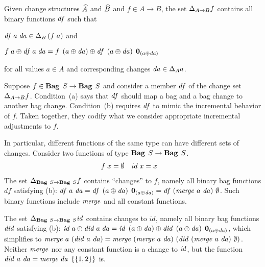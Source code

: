 
\begin{definition}
  \label{def:function-changes:change}
  Given change structures $\widehat{A}$ and $\widehat{B}$ and
  $f \in A \to B$,
  the set $\Change[A \to B]{f}$ contains all binary functions $\mathit{df}$ such that
  \begin{subdefinition}
    \item
      \label{def:function-changes:signature}
      $\App{\App{\D f}{a}}{\D a} \in \Change[B]{\App*{f}{a}}$ and
    \item
      \label{def:function-changes:validity}
      $\App{f}{a} \UPDATE \App{\App{\D f}{a}}{\D a} =
      {\App{f}{\TheNewValue}}
      \UPDATE
      \App{\App{\D f}{\TheNewValue}}{\Nil{\TheNewValue}}$
  \end{subdefinition}
  for all values $a \in A$ and corresponding changes $\D a \in
  \Change[A]{a}$.
\end{definition}

\begin{examples}
Suppose $f\in\Fun{\Bag S}{\Bag S}$ and consider a member $\mathit{df}$ of
the change set $\Change[A \to B]{f}$. Condition~(a) says that $\mathit{df}$ should map a bag and a bag change to another bag change.
Condition~(b) requires $\mathit{df}$ to mimic the incremental behavior
of $f$. Taken together, they codify what we consider appropriate
incremental adjustments to $f$.

In particular, different functions of the same type can have
different sets of changes. Consider two functions of type
$\Fun{\Bag S}{\Bag S}$.
\begin{align*}
\App{f}{x} & = \Empty & \App{\Var{id}}{x} & = x
\end{align*}
The set
$\Change[\Fun{\Bag S}{\Bag S}] f$ contains ``changes'' to $f$,
namely all binary bag functions $df$ satisfying
(b): $\D{f}~a~\D{a}=\D{f}\APP\Upd*{a}\APP\Nil{\Upd*{a}}= \D{f}~(\MERGE~a~\D{a})~\Empty$.
Such binary functions include
$\mathit{merge}$ and all constant functions.

The set $\Change[\Fun{\Bag S}{\Bag S}]\Term{id}$ contains changes to $id$,
namely all binary bag functions $\mathit{did}$ satisfying
(b):
$\Term{id}\APP a \UPDATE \D{id} \APP a \APP \D{a} =
\Term{id} \APP \Upd*{a} \UPDATE \D{id} \APP \Upd*{a} \APP
\Nil{\Upd*{a}}$, which simplifies to
$\MERGE~a~(\D{id}~a~\D{a})=
\MERGE~(\MERGE~a~\D{a})~(\D{id}~(\MERGE~a~\D{a})~\Empty)$.
Neither $\mathit{merge}$ nor any constant function is a change to
$\mathit{id}$,
but the function
$
\D{id}~a~\D a = \Merge{\D a}{\Set{1,2}}
$ is.
\end{examples}

